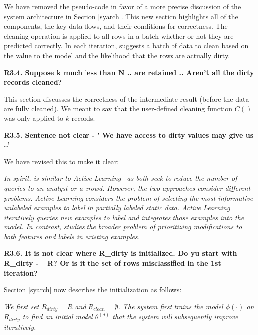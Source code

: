 \noindent  We have removed the pseudo-code in favor of a more precise discussion of the system architecture in Section \ref{syarch}. This new section highlights all of the components, the key data flows, and their conditions for correctness. 
The cleaning operation is applied to all rows in a batch whether or not they are predicted correctly.
In each iteration, \sys suggests a batch of data to clean based on the value to the model and the likelihood that the rows are actually dirty.

\vspace{0.5em}

\noindent \textbf{R3.4. Suppose k much less than N .. are retained .. Aren't all
the dirty records cleaned?}

\noindent This section discusses the correctness of the intermediate result (before the data are fully cleaned).
We meant to say that the user-defined cleaning function $C()$ was only applied to $k$ records.

\vspace{0.5em}

\noindent\textbf{R3.5. Sentence not clear - ' We have access to dirty
values may give us ..'}

 \noindent We have revised this to make it clear:

\emph{In spirit, \sys is similar to Active Learning~\cite{DBLP:journals/pvldb/YakoutENOI11,gokhale2014corleone} as both seek to reduce the number of queries to an analyst or a crowd.
However, the two approaches consider different problems.
Active Learning considers the problem of selecting the most informative unlabeled examples to label in partially labeled static data.
Active Learning iteratively queries new examples to label and integrates those examples into the model.
In contrast, \sys studies the broader problem of prioritizing modifications to both features and labels in existing examples.} 

\vspace{0.5em}

\noindent\textbf{R3.6. It is not clear where R\_dirty is initialized. Do yu start with R\_dirty -= R? Or is it the set of rows misclassified in the 1st iteration?}

\noindent Section \ref{syarch} now describes the initialization as follows:

\emph{We first set $R_{dirty} = R$ and $R_{clean} = \emptyset$.
The system first trains the model $\phi(\cdot)$ on $R_{dirty}$ to find an initial model $\theta^{(d)}$ that the system will subsequently improve iteratively.}


